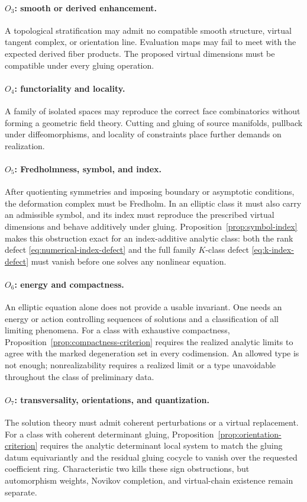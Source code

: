 \documentclass[11pt,letterpaper,twoside]{article}
\theoremstyle{plain}
\theoremstyle{definition}
\theoremstyle{remark}
\begin{document}
\paragraph{\(O_3\): smooth or derived enhancement.}
A topological stratification may admit no compatible smooth structure, virtual tangent complex, or orientation line.  Evaluation maps may fail to meet with the expected derived fiber products.  The proposed virtual dimensions must be compatible under every gluing operation.

\paragraph{\(O_4\): functoriality and locality.}
A family of isolated spaces may reproduce the correct face combinatorics without forming a geometric field theory.  Cutting and gluing of source manifolds, pullback under diffeomorphisms, and locality of constraints place further demands on realization.

\paragraph{\(O_5\): Fredholmness, symbol, and index.}
After quotienting symmetries and imposing boundary or asymptotic conditions, the deformation complex must be Fredholm.  In an elliptic class it must also carry an admissible symbol, and its index must reproduce the prescribed virtual dimensions and behave additively under gluing.  Proposition~\ref{prop:symbol-index} makes this obstruction exact for an index-additive analytic class: both the rank defect \eqref{eq:numerical-index-defect} and the full family $K$-class defect \eqref{eq:k-index-defect} must vanish before one solves any nonlinear equation.

\paragraph{\(O_6\): energy and compactness.}
An elliptic equation alone does not provide a usable invariant.  One needs an energy or action controlling sequences of solutions and a classification of all limiting phenomena.  For a class with exhaustive compactness, Proposition~\ref{prop:compactness-criterion} requires the realized analytic limits to agree with the marked degeneration set in every codimension.  An allowed type is not enough; nonrealizability requires a realized limit or a type unavoidable throughout the class of preliminary data.

\paragraph{\(O_7\): transversality, orientations, and quantization.}
The solution theory must admit coherent perturbations or a virtual replacement.  For a class with coherent determinant gluing, Proposition~\ref{prop:orientation-criterion} requires the analytic determinant local system to match the gluing datum equivariantly and the residual gluing cocycle to vanish over the requested coefficient ring.  Characteristic two kills these sign obstructions, but automorphism weights, Novikov completion, and virtual-chain existence remain separate.
\end{document}
